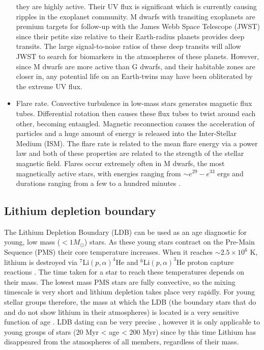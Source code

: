 \begin{itemize}
they are highly active.
Their UV flux is significant which is currently causing ripples in the
exoplanet community.
M dwarfs with transiting exoplanets are premium targets for follow-up with the
James Webb Space Telescope (JWST) since their petite size relative to their
Earth-radius planets provides deep transits.
The large signal-to-noise ratios of these deep transits will allow JWST to
search for biomarkers in the atmospheres of these planets.
However, since M dwarfs are more active than G dwarfs, and their habitable
zones are closer in, any potential life on an Earth-twins may have been
obliterated by the extreme UV flux.
\item{Flare rate.
Convective turbulence in low-mass stars generates magnetic flux tubes.
Differential rotation then causes these flux tubes to twist around each other,
becoming entangled.
Magnetic reconnection causes the acceleration of particles and a huge amount
of energy is released into the Inter-Stellar Medium (ISM).
The flare rate is related to the mean flare energy via a power law
\citep{Davenport2015, Hawley2014} and both of these properties are related to
the strength of the stellar magnetic field.
Flares occur extremely often in M dwarfs, the most magnetically active stars,
with energies ranging from $\sim e^{29} - e^{33}$ ergs and durations ranging
from a few to a hundred minutes \citep{Hawley2014}.
}
\end{itemize}

\subsection{Lithium depletion boundary}
The Lithium Depletion Boundary (LDB) can be used as an age diagnostic for
young, low mass ($<1M_\odot$) stars.
As these young stars contract on the Pre-Main Sequence (PMS) their core
temperature increases.
When it reaches $\sim2.5\times10^6$ K, lithium is destroyed via $^7$Li$(p,
\alpha)^4$He and $^6$Li$(p, \alpha)^3$He proton capture reactions
\citep[\eg][]{Bodenheimer1965}.
The time taken for a star to reach these temperatures depends on their mass.
The lowest mass PMS stars are fully convective, so the mixing timescale is
very short and lithium depletion takes place very rapidly.
For young stellar groups therefore, the mass at which the LDB (the boundary
stars that do and do not show lithium in their atmospheres) is located is a
very sensitive function of age \citep{Basri1996}.
LDB dating can be very precise \citep{Burke2004}, however it is only
applicable to young groups of stars (20 Myr < age < 200 Myr) since by this
time Lithium has disappeared from the atmospheres of all members, regardless
of their mass.

